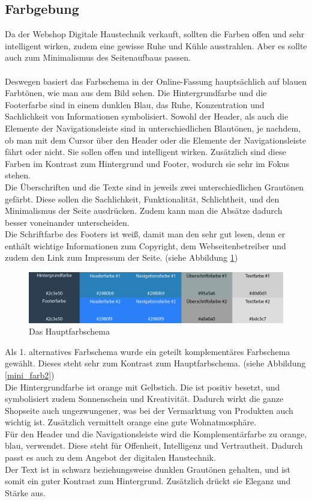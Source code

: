 	\subsection{Farbgebung}
Da der Webshop Digitale Haustechnik verkauft, sollten die Farben offen und sehr intelligent wirken, zudem eine gewisse Ruhe und Kühle ausstrahlen. Aber es sollte auch zum Minimalismus des Seitenaufbaus passen.
\\
\\
Deswegen basiert das Farbschema in der Online-Fassung hauptsächlich auf blauen Farbtönen, wie man aus dem Bild sehen. Die Hintergrundfarbe und die Footerfarbe sind in einem dunklen Blau, das Ruhe, Konzentration und Sachlichkeit von Informationen symbolisiert. 
Sowohl der Header, als auch die Elemente der Navigationsleiste sind in unterschiedlichen Blautönen, je nachdem, ob man mit dem Cursor über den Header oder die Elemente der Navigationsleiste fährt oder nicht. Sie sollen offen und intelligent wirken. Zusätzlich sind diese Farben im Kontrast zum Hintergrund und Footer, wodurch sie sehr im Fokus stehen.
\\
Die Überschriften und die Texte sind in jeweils zwei unterschiedlichen Grautönen gefärbt. Diese sollen die Sachlichkeit, Funktionalität, Schlichtheit, und den Minimalismus der Seite ausdrücken. Zudem kann man die Absätze dadurch besser voneinander unterscheiden.
\\
Die Schriftfarbe des Footers ist weiß, damit man den sehr gut lesen, denn er enthält wichtige Informationen zum Copyright, dem Webseitenbetreiber und zudem den Link zum Impressum der Seite. (siehe Abbildung \ref{mini_farb1})
\begin{figure} [hp]
\includegraphics[width=\textwidth]{./img/mini_farb1.png}
\caption{Das Hauptfarbschema}
\label{mini_farb1}
\end{figure}

Als 1. alternatives Farbschema wurde ein geteilt komplementäres Farbschema gewählt. Dieses steht sehr zum Kontrast zum Hauptfarbschema. (siehe Abbildung \ref{mini_farb2}) 
\\
Die Hintergrundfarbe ist orange mit Gelbstich. Die ist positiv besetzt, und symbolisiert zudem Sonnenschein und Kreativität. Dadurch wirkt die ganze Shopseite auch ungezwungener, was bei der Vermarktung von Produkten auch wichtig ist. Zusätzlich vermittelt orange eine gute Wohnatmosphäre.
\\
Für den Header und die Navigationsleiste wird die Komplementärfarbe zu orange, blau, verwendet. Diese steht für Offenheit, Intelligenz und Vertrautheit. Dadurch passt es auch zu dem Angebot der digitalen Haustechnik. 
\\
Der Text ist in schwarz beziehungsweise dunklen Grautönen gehalten, und ist somit ein guter Kontrast zum Hintergrund. Zusätzlich drückt sie Eleganz und Stärke aus.

